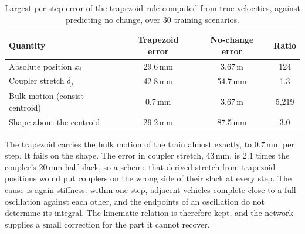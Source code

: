 \begin{table}[htbp]
    \centering
    \begin{tabular}{lccc}
        \toprule
        Quantity & Trapezoid error & No-change error & Ratio \\
        \midrule
        Absolute position $x_i$              & 29.6\,mm & 3.67\,m & 124 \\
        Coupler stretch $\delta_j$            & 42.8\,mm & 54.7\,mm & 1.3 \\
        Bulk motion (consist centroid)        & 0.7\,mm  & 3.67\,m  & 5,219 \\
        Shape about the centroid              & 29.2\,mm & 87.5\,mm & 3.0 \\
        \bottomrule
    \end{tabular}
    \caption{Largest per-step error of the trapezoid rule computed from true velocities, against predicting no change, over 30 training scenarios.}
    \label{tab:arch_position_split}
\end{table}

The trapezoid carries the bulk motion of the train almost exactly, to 0.7\,mm per step. It fails on the shape. The error in coupler stretch, 43\,mm, is 2.1 times the coupler's 20\,mm half-slack, so a scheme that derived stretch from trapezoid positions would put couplers on the wrong side of their slack at every step. The cause is again stiffness: within one step, adjacent vehicles complete close to a full oscillation against each other, and the endpoints of an oscillation do not determine its integral. The kinematic relation is therefore kept, and the network supplies a small correction for the part it cannot recover.

